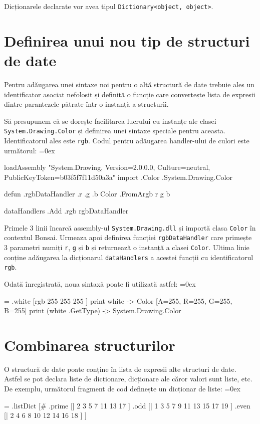 \documentclass[12pt,a4paper]{memoir}
\renewcommand{\c}{\texttt}
\newenvironment{code}
{
\definecolor{shadecolor}{gray}{0.91}
\topsep=0ex
\relax
\shaded
\verbatim
}
{
\endverbatim
\endshaded
}
\begin{document}
Dicționarele declarate vor avea tipul \c{Dictionary<object, object>}.

\section{Definirea unui nou tip de structuri de date}

Pentru adăugarea unei sintaxe noi pentru o altă structură de date trebuie ales un identificator asociat nefolosit și definită o funcție care convertește lista de expresii dintre parantezele pătrate într-o instanță a structurii.

Să presupunem că se dorește facilitarea lucrului cu instanțe ale clasei \c{System.Drawing.Color} și definirea unei sintaxe speciale pentru aceasta. Identificatorul ales este \c{rgb}. Codul pentru adăugarea handler-ului de culori este următorul:
\newpage
\begin{code}
loadAssembly "System.Drawing, Version=2.0.0.0, Culture=neutral,
    PublicKeyToken=b03f5f7f11d50a3a"
import .Color .System.Drawing.Color

defun .rgbDataHandler .r .g .b {
	Color .FromArgb r g b
}

dataHandlers .Add .rgb rgbDataHandler
\end{code}
Primele 3 linii încarcă assembly-ul \c{System.Drawing.dll} și importă clasa \c{Color} în contextul Bonsai. Urmeaza apoi definirea funcției \c{rgbDataHandler} care primește 3 parametri numiți \c{r}, \c{g} și \c{b} și returnează o instanță a clasei \c{Color}. Ultima linie conține adăugarea la dicționarul \c{dataHandlers} a acestei funcții cu identificatorul \c{rgb}. 

Odată înregistrată, noua sintaxă poate fi utilizată astfel:
\begin{code}
= .white [rgb 255 255 255 ]
print white
  -> Color [A=255, R=255, G=255, B=255]
print (white .GetType)
  -> System.Drawing.Color
\end{code}

\section{Combinarea structurilor}

O structură de date poate conține în lista de expresii alte structuri de date. Astfel se pot declara liste de dicționare, dicționare ale căror valori sunt liste, etc. De exemplu, următorul fragment de cod definește un dicționar de liste:
\begin{code}
= .listDict [#
  .prime [| 2 3 5 7 11 13 17 ]
  .odd [| 1 3 5 7 9 11 13 15 17 19 ]
  .even [| 2 4 6 8 10 12 14 16 18 ]
]
\end{code}
\end{document}
